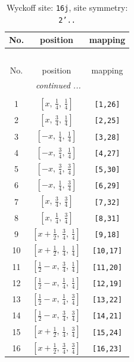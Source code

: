 \documentclass[fleqn,8pt]{jsarticle}
\begin{document}
\renewcommand{\arraystretch}{1.2}
\begin{longtable}{ccc}
\caption{Wyckoff site: {\tt 16j}, site symmetry: {\tt 2'..}}
 \\
 \hline \hline
No. & position & mapping \\ \hline \endfirsthead

\multicolumn{2}{l}{\tablename\ \thetable{}} \\
 \hline \hline
No. & position & mapping \\ \hline \endhead

 \hline \hline
\multicolumn{2}{r}{\footnotesize\it continued ...} \\ \endfoot

 \hline \hline
\multicolumn{2}{r}{} \\ \endlastfoot

1 & $\left[ x,\, \frac{1}{4},\, \frac{1}{4} \right]$ & {\tt [1,26]} \\ \hline
2 & $\left[ x,\, \frac{3}{4},\, \frac{1}{4} \right]$ & {\tt [2,25]} \\ \hline
3 & $\left[ - x,\, \frac{1}{4},\, \frac{1}{4} \right]$ & {\tt [3,28]} \\ \hline
4 & $\left[ - x,\, \frac{3}{4},\, \frac{1}{4} \right]$ & {\tt [4,27]} \\ \hline
5 & $\left[ - x,\, \frac{3}{4},\, \frac{3}{4} \right]$ & {\tt [5,30]} \\ \hline
6 & $\left[ - x,\, \frac{1}{4},\, \frac{3}{4} \right]$ & {\tt [6,29]} \\ \hline
7 & $\left[ x,\, \frac{3}{4},\, \frac{3}{4} \right]$ & {\tt [7,32]} \\ \hline
8 & $\left[ x,\, \frac{1}{4},\, \frac{3}{4} \right]$ & {\tt [8,31]} \\ \hline
9 & $\left[ x + \frac{1}{2},\, \frac{3}{4},\, \frac{1}{4} \right]$ & {\tt [9,18]} \\ \hline
10 & $\left[ x + \frac{1}{2},\, \frac{1}{4},\, \frac{1}{4} \right]$ & {\tt [10,17]} \\ \hline
11 & $\left[ \frac{1}{2} - x,\, \frac{3}{4},\, \frac{1}{4} \right]$ & {\tt [11,20]} \\ \hline
12 & $\left[ \frac{1}{2} - x,\, \frac{1}{4},\, \frac{1}{4} \right]$ & {\tt [12,19]} \\ \hline
13 & $\left[ \frac{1}{2} - x,\, \frac{1}{4},\, \frac{3}{4} \right]$ & {\tt [13,22]} \\ \hline
14 & $\left[ \frac{1}{2} - x,\, \frac{3}{4},\, \frac{3}{4} \right]$ & {\tt [14,21]} \\ \hline
15 & $\left[ x + \frac{1}{2},\, \frac{1}{4},\, \frac{3}{4} \right]$ & {\tt [15,24]} \\ \hline
16 & $\left[ x + \frac{1}{2},\, \frac{3}{4},\, \frac{3}{4} \right]$ & {\tt [16,23]} \\
\end{longtable}
\end{document}
